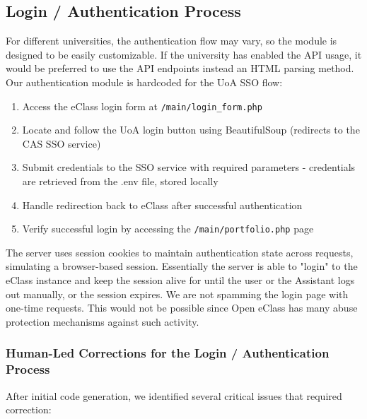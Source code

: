 \documentclass[11pt,a4paper]{article}
\begin{document}
\subsection{Login / Authentication Process}
For different universities, the authentication flow may vary, so the module is designed to be easily customizable. If the university has enabled the API usage, it would be preferred to use the API endpoints instead an HTML parsing method. Our authentication module is hardcoded for the UoA SSO flow:

\begin{enumerate}
    \item Access the eClass login form at \texttt{/main/login\_form.php}
    \item Locate and follow the UoA login button using BeautifulSoup (redirects to the CAS SSO service) 
    \item Submit credentials to the SSO service with required parameters - credentials are retrieved from the .env file, stored locally
    \item Handle redirection back to eClass after successful authentication 
    \item Verify successful login by accessing the \texttt{/main/portfolio.php} page
\end{enumerate}
The server uses session cookies to maintain authentication state across requests, simulating a browser-based session. Essentially the server is able to "login" to the eClass instance and keep the session alive for until the user or the Assistant logs out manually, or the session expires. We are not spamming the login page with one-time requests. This would not be possible since Open eClass has many abuse protection mechanisms against such activity.

\subsubsection{Human-Led Corrections for the Login / Authentication Process}
After initial code generation, we identified several critical issues that required correction:
\end{document}
